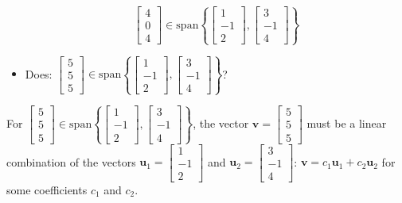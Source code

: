 \documentclass{article}
\begin{document}
\begin{itemize}
\[\begin{bmatrix} 4 \\ 0 \\ 4 \end{bmatrix} \in \text{span}\left\{\begin{bmatrix} 1 \\ -1 \\ 2 \end{bmatrix}, \begin{bmatrix} 3 \\ -1 \\ 4 \end{bmatrix}\right\}\]  
\item Does: \(\begin{bmatrix} 5 \\ 5 \\ 5 \end{bmatrix} \in \text{span}\left\{\begin{bmatrix} 1 \\ -1 \\ 2 \end{bmatrix}, \begin{bmatrix} 3 \\ -1 \\ 4 \end{bmatrix}\right\}\)?  
\end{itemize}

For \(\begin{bmatrix} 5 \\ 5 \\ 5 \end{bmatrix} \in \text{span}\left\{\begin{bmatrix} 1 \\ -1 \\ 2 \end{bmatrix}, \begin{bmatrix} 3 \\ -1 \\ 4 \end{bmatrix}\right\}\), the vector \(\mathbf{v} = \begin{bmatrix} 5 \\ 5 \\ 5 \end{bmatrix}\) must be a linear combination of the vectors \(\mathbf{u}_1 = \begin{bmatrix} 1 \\ -1 \\ 2 \end{bmatrix}\) and \(\mathbf{u}_2 = \begin{bmatrix} 3 \\ -1 \\ 4 \end{bmatrix}\): \(\mathbf{v} = c_1\mathbf{u}_1 + c_2\mathbf{u}_2\) for some coefficients \(c_1\) and \(c_2\).
\end{document}

